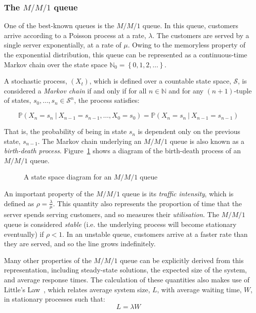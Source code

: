 \subsubsection{The \(M/M/1\) queue}

One of the best-known queues is the \(M/M/1\) queue. In this queue, customers
arrive according to a Poisson process at a rate, \(\lambda\). The customers are
served by a single server exponentially, at a rate of \(\mu\). Owing to the
memoryless property of the exponential distribution, this queue can be
represented as a continuous-time Markov chain over the state space
\(\mathbb{N}_0 = \left\{0, 1, 2, \ldots\right\}\).

A stochastic process, \(\left(X_t\right)\), which is defined over a countable
state space, \(\mathcal S\), is considered a \emph{Markov chain} if and only if
for all \(n \in \mathbb N\) and for any \((n+1)\)-tuple of states, \(s_0,
\ldots, s_n \in \mathcal S^n\), the process satisfies:

\begin{equation}
    \mathbb P \left(X_n = s_n \ | \ X_{n-1} = s_{n-1}, \ldots, X_0 = s_0\right)
    = \mathbb P \left(X_n = s_n \ | \ X_{n-1} = s_{n-1}\right)
\end{equation}

That is, the probability of being in state \(s_n\) is dependent only on the
previous state, \(s_{n-1}\). The Markov chain underlying an \(M/M/1\) queue is also
known as a \emph{birth-death process}. Figure~\ref{fig:birth_death_mm1} shows a
diagram of the birth-death process of an \(M/M/1\) queue.

\begin{figure}[htbp]
    \centering
    \resizebox{\imgwidth}{!}{%
        
    }\caption{
        A state space diagram for an \(M/M/1\) queue%
    }\label{fig:birth_death_mm1}
\end{figure}

An important property of the \(M/M/1\) queue is its \emph{traffic intensity},
which is defined as \(\rho = \frac{\lambda}{\mu}\). This quantity also
represents the proportion of time that the server spends serving customers, and
so measures their \emph{utilisation}. The \(M/M/1\) queue is considered
\emph{stable} (i.e. the underlying process will become stationary eventually) if
\(\rho < 1\). In an unstable queue, customers arrive at a faster rate than they
are served, and so the line grows indefinitely.

Many other properties of the \(M/M/1\) queue can be explicitly derived from this
representation, including steady-state solutions, the expected size of the
system, and average response times. The calculation of these quantities also
makes use of Little's Law~\cite{Little1961}, which relates average system size,
\(L\), with average waiting time, \(W\), in stationary processes such that:
\begin{equation}
    L = \lambda W
\end{equation}

